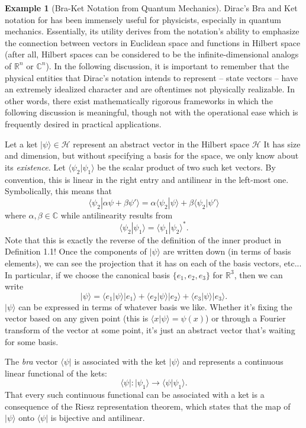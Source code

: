 \documentclass{article}
\theoremstyle{definition}
\newtheorem{exmp}[thm]{Example}
\theoremstyle{remark}
\numberwithin{equation}{section}
\begin{document}
\begin{exmp}[Bra-Ket Notation from Quantum Mechanics]
Dirac's Bra and Ket notation for has been immensely useful for physicists, especially in quantum mechanics. Essentially, its utility derives from the notation's ability to emphasize the connection between vectors in Euclidean space and functions in Hilbert space (after all, Hilbert spaces can be considered to be the infinite-dimensional analogs of $\mathbb{R}^n$ or $\mathbb{C}^n$). In the following discussion, it is important to remember that the physical entities that Dirac's notation intends to represent -- state vectors -- have an extremely idealized character and are oftentimes not physically realizable. In other words, there exist mathematically rigorous frameworks in which the following discussion is meaningful, though not with the operational ease which is frequently desired in practical applications. 

Let a ket $|\psi \rangle \in \mathcal{H}$ represent an abstract vector in the Hilbert space $\mathcal{H}$ It has size and dimension, but without specifying a basis for the space, we only know about its \textit{existence}. Let $\langle \psi _2 | \psi _1 \rangle $ be the scalar product of two such ket vectors. By convention, this is linear in the right entry and antilinear in the left-most one. Symbolically, this means that 
$$\langle \psi _2 | \alpha \psi + \beta \psi ' \rangle = \alpha \langle \psi _2 | \psi \rangle + \beta \langle \psi _2 | \psi ' \rangle $$
where $\alpha, \beta \in \mathbb{C}$ while antilinearity results from 
$$\langle \psi _2 | \psi _1 \rangle = \langle \psi _1 | \psi _2 \rangle ^*. $$
Note that this is exactly the reverse of the definition of the inner product in Definition 1.1! Once the components of $| \psi \rangle$ are written down (in terms of basis elements), we can see the projection that it has on each of the basis vectors, etc... In particular, if we choose the canonical basis $\{ e_1, e_2 ,e_3 \}$ for $\mathbb{R}^3$, then we can write 
$$| \psi \rangle = \langle e_1 | \psi \rangle |e_1 \rangle + \langle e_2 | \psi \rangle |e_2 \rangle + \langle e_3 | \psi \rangle |e_3 \rangle .$$
$|\psi \rangle $ can be expressed in terms of whatever basis we like. Whether it's fixing the vector based on any given point (this is $\langle x | \psi \rangle = \psi (x)$) or through a Fourier transform of the vector at some point, it's just an abstract vector that's waiting for some basis. 

The \textit{bra} vector $\langle \psi |$ is associated with the ket $|\psi \rangle$ and represents a continuous linear functional of the kets: 
$$\langle \psi | :  | \psi _1 \rangle \rightarrow \langle \psi | \psi _1 \rangle. $$
That every such continuous functional can be associated with a ket is a consequence of the Riesz representation theorem, which states that the map of $| \psi \rangle$ onto $\langle \psi |$ is bijective and antilinear. 

\end{exmp}
\end{document}
